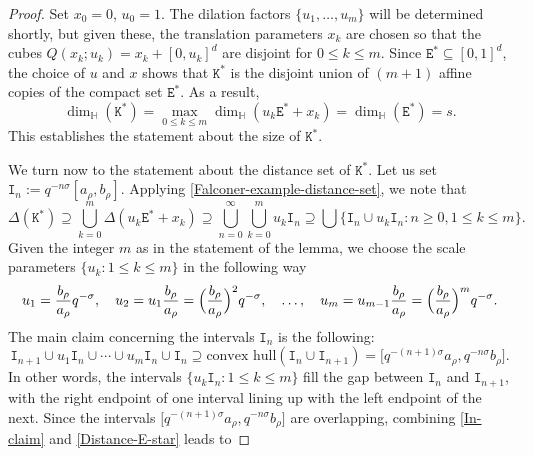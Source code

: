 \documentclass[a4paper,11pt]{amsart}
\numberwithin{equation}{section}
\begin{document}
\begin{proof} 
Set $x_0 = 0$, $u_0 = 1$. The dilation factors $\{u_1, \ldots, u_m \}$ will be determined shortly, but given these, the translation parameters $x_k$ are chosen so that the cubes $Q(x_k; u_k) = x_k + [0, u_k]^d$ are disjoint for $0 \leq k \leq m$. Since $\mathtt E^{\ast} \subseteq [0,1]^d$, 
the choice of $u$ and $x$ shows that $\mathtt K^{\ast}$ is the disjoint union of $(m+1)$ affine copies of the compact set $\mathtt E^{\ast}$. As a result, 
\[ \dim_{\mathbb H}(\mathtt K^{\ast}) = \max_{0 \leq k \leq m} \dim_{\mathbb H}(u_k\mathtt E^{\ast} + x_k) = \dim_{\mathbb H}(\mathtt E^{\ast}) = s. \] 
This establishes the statement about the size of $\mathtt K^{\ast}$. 
\vskip0.1in
\item We turn now to the statement about the distance set of $\mathtt K^{\ast}$. Let us set $\mathtt I_n := q^{-n \sigma} [a_{\rho}, b_{\rho}]$. Applying \eqref{Falconer-example-distance-set}, we note that 
\begin{equation} \Delta(\mathtt K^{\ast}) \supseteq \bigcup_{k=0}^{m} \Delta(u_k \mathtt E^{\ast} + x_k)  \supseteq \bigcup_{n=0}^{\infty} \bigcup_{k=0}^{m} u_k \mathtt I_n \supseteq  \bigcup \bigl\{\mathtt I_n \cup u_k \mathtt I_n : n \geq 0, 1 \leq k \leq m \bigr\}. 
\label{Distance-E-star} \end{equation} 
Given the integer $m$ as in the statement of the lemma, we choose the scale parameters $\{u_k: 1 \leq k \leq m\}$ in the following way
\begin{equation} \label{choice-uk} 
u_1 = \frac{b_{\rho}}{a_{\rho}} q^{-\sigma}, \quad u_2 = u_1 \frac{b_{\rho}}{a_{\rho}} = \Bigl(\frac{b_{\rho}}{a_{\rho}} \Bigr)^2 q^{-\sigma}, \quad \ldots, \quad u_m = u_{m-1} \frac{b_{\rho}}{a_{\rho}} = \Bigl(\frac{b_{\rho}}{a_{\rho}} \Bigr)^m q^{-\sigma}.  \end{equation}  
The main claim concerning the intervals $\mathtt I_n$ is the following: 
\begin{equation} \label{In-claim} \mathtt I_{n+1} \cup u_1 \mathtt I_{n} \cup \cdots \cup u_m \mathtt I_{n} \cup \mathtt I_n \supseteq \text{convex hull$(\mathtt I_n \cup \mathtt I_{n+1})$} = \bigl[q^{-(n+1)\sigma}a_{\rho}, q^{-n\sigma}b_{\rho} \bigr]. \end{equation}
In other words, the intervals $\{u_k \mathtt I_{n} : 1 \leq k \leq m \}$ fill the gap between $\mathtt I_n$ and $\mathtt I_{n+1}$, with the right endpoint of one interval lining up with the left endpoint of the next. Since the intervals $\bigl[q^{-(n+1)\sigma}a_{\rho}, q^{-n\sigma}b_{\rho} \bigr]$ are overlapping, combining \eqref{In-claim} and \eqref{Distance-E-star} leads to

\end{proof}
\end{document}
